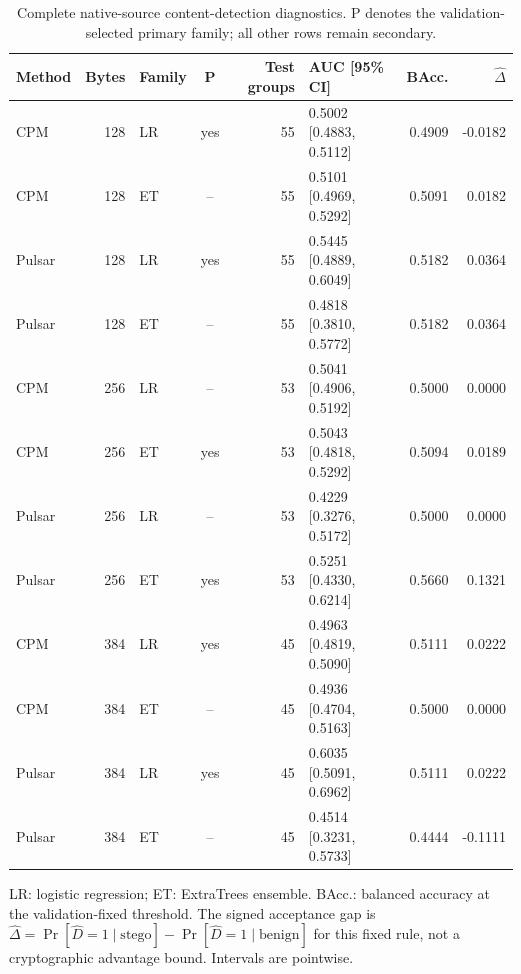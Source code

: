 \documentclass[journal]{IEEEtran}
\renewcommand{\arraystretch}{1.2}
\renewcommand{\arraystretch}{1.0}
\theoremstyle{definition}
\theoremstyle{game}
\renewcommand{\arraystretch}{1.5}
\begin{document}
\begin{table}[!t]
\centering\small
\caption{Complete native-source content-detection diagnostics. P denotes the validation-selected primary family; all other rows remain secondary.}
\label{tab:native-detection}
\setlength{\tabcolsep}{4pt}\renewcommand{\arraystretch}{1.12}
\begin{tabular}{lrlcrlrr}
\toprule
Method & Bytes & Family & P & Test groups & AUC [95\% CI] & BAcc. & $\widehat\Delta$\\
\midrule
CPM & 128 & LR & yes & 55 & 0.5002 [0.4883, 0.5112] & 0.4909 & -0.0182\\
CPM & 128 & ET & -- & 55 & 0.5101 [0.4969, 0.5292] & 0.5091 & 0.0182\\
Pulsar & 128 & LR & yes & 55 & 0.5445 [0.4889, 0.6049] & 0.5182 & 0.0364\\
Pulsar & 128 & ET & -- & 55 & 0.4818 [0.3810, 0.5772] & 0.5182 & 0.0364\\
CPM & 256 & LR & -- & 53 & 0.5041 [0.4906, 0.5192] & 0.5000 & 0.0000\\
CPM & 256 & ET & yes & 53 & 0.5043 [0.4818, 0.5292] & 0.5094 & 0.0189\\
Pulsar & 256 & LR & -- & 53 & 0.4229 [0.3276, 0.5172] & 0.5000 & 0.0000\\
Pulsar & 256 & ET & yes & 53 & 0.5251 [0.4330, 0.6214] & 0.5660 & 0.1321\\
CPM & 384 & LR & yes & 45 & 0.4963 [0.4819, 0.5090] & 0.5111 & 0.0222\\
CPM & 384 & ET & -- & 45 & 0.4936 [0.4704, 0.5163] & 0.5000 & 0.0000\\
Pulsar & 384 & LR & yes & 45 & 0.6035 [0.5091, 0.6962] & 0.5111 & 0.0222\\
Pulsar & 384 & ET & -- & 45 & 0.4514 [0.3231, 0.5733] & 0.4444 & -0.1111\\
\bottomrule
\end{tabular}
\par\smallskip\parbox{.97\textwidth}{\footnotesize LR: logistic regression; ET: ExtraTrees ensemble. BAcc.: balanced accuracy at the validation-fixed threshold. The signed acceptance gap is $\widehat\Delta=\Pr[\widehat D=1\mid\mathrm{stego}]-\Pr[\widehat D=1\mid\mathrm{benign}]$ for this fixed rule, not a cryptographic advantage bound. Intervals are pointwise.}
\end{table}
\end{document}
